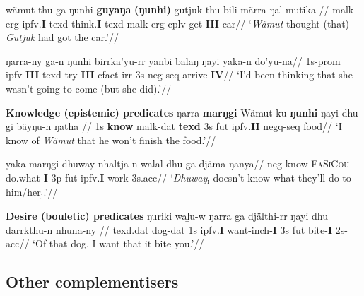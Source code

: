 \a{}\begingl\gla wämut-thu ga ŋunhi \textbf{guyaŋa} \nogloss{[} \textbf{(ŋunhi)} gutjuk-thu bili märra-ŋal mutika \nogloss{]}//
\glb \gls{malk}-\gls{erg} \gls{ipfv}.\textbf{I} \gls{texd} think.\textbf{I} \gls{texd} \gls{malk}-\gls{erg} \gls{cplv} get-\textbf{III} car//
\glft`\textit{Wämut} thought (that) \textit{Gutjuk} had got the car.'//\endgl

\a \begingl\gla ŋarra-ny ga-n ŋunhi birrka'yu-rr \nogloss{[} yanbi balaŋ ŋayi yaka-n ḏo'yu-na\nogloss{]}//
\glb 1s-\gls{prom} \gls{ipfv}-\textbf{III} \gls{texd} try-\textbf{III} \gls{cfact} \gls{irr} 3s \gls{neg}-\gls{seq} arrive-\textbf{IV}//
\glft`I'd been thinking that she wasn't going to come (but she did).'//\endgl
\xe

\pex{}\textbf{Knowledge (epistemic) predicates}
\a\begingl\gla ŋarra \textbf{marŋgi} Wämut-ku \nogloss{[} \textbf{ŋunhi} ŋayi dhu gi bäyŋu-n ŋatha \nogloss{]}//
\glb 1s \textbf{know} \gls{malk}-\gls{dat} \textbf{\gls{texd}} 3s \gls{fut} \gls{ipfv}.\textbf{II} \gls{negq}-\gls{seq} food//
\glft`I know of \textit{Wämut} that he won't finish the food.'//\endgl

\a\begingl\gla yaka marŋgi dhuway nhaltja-n walal dhu ga djäma ŋanya//
\glb \gls{neg} know \textsc{FaSiCou} do.what-\textbf{I} 3p \gls{fut} \gls{ipfv}.\textbf{I} work 3s.\gls{acc}//
\glft`\textit{Dhuway}$_\imath$ doesn't know what they'll do to him/her$_\jmath$.'//\endgl{}



\xe

\pex{}\textbf{Desire (bouletic) predicates}
\a\begingl\gla ŋuriki waḻu-w ŋarra ga djälthi-rr \nogloss{[} ŋayi dhu ḏarrkthu-n nhuna-ny \nogloss{]}//
\glb \gls{texd}.\gls{dat} dog-\gls{dat} 1s \gls{ipfv}.\textbf{I} want-\gls{inch}-\textbf{I} 3s \gls{fut} bite-\textbf{I} 2s-\gls{acc}//
\glft`Of that dog, I want that it bite you.'//\endgl\xe


\subsection{Other complementisers}

